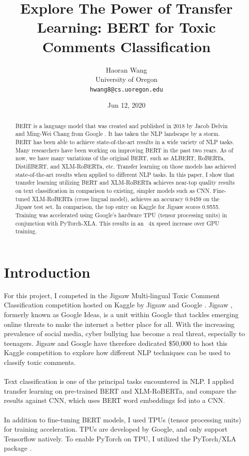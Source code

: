 \documentclass[11pt,a4paper]{article}
\title{Explore The Power of Transfer Learning: BERT for Toxic Comments Classification}
\author{Haoran Wang \\
  University of Oregon \\
  {\tt hwang8@cs.uoregon.edu} }
\date{Jun 12, 2020}
\begin{document}
\maketitle
\begin{abstract}
BERT is a language model that was created and published in 2018 by Jacob Delvin and Ming-Wei Chang from Google \cite{BERT}. It has taken the NLP landscape by a storm. BERT has been able to achieve state-of-the-art results in a wide variety of NLP tasks. Many researchers have been working on improving BERT in the past two years. As of now, we have  many variations of the original BERT, such as ALBERT, RoBERTa, DistillBERT, and XLM-RoBERTa, etc. Transfer learning on those models has achieved state-of-the-art results when applied to different NLP tasks. In this paper, I show that transfer learning utilizing BERT and XLM-RoBERTa achieves near-top quality results on text classification in comparison to existing, simpler models such as CNN. Fine-tuned XLM-RoBERTa (cross lingual model), achieves an accuracy 0.9459 on the Jigsaw test set. In comparison, the top entry on Kaggle for Jigsaw scores 0.9555. Training was accelerated using Google's hardware TPU (tensor processing units) in conjunction with PyTorch-XLA. This results in an ~4x speed increase over GPU training.
\end{abstract}

\section{Introduction}

For this project, I competed in the Jigsaw Multi-lingual Toxic Comment Classification competition hosted on Kaggle by Jigsaw and Google \cite{kaggle}. Jigsaw \cite{jigsaw}, formerly known as Google Ideas, is a unit within Google that tackles emerging online threats to make the internet a better place for all. With the increasing prevalence of social media, cyber bullying has become a real threat, especially to teenagers. Jigsaw and Google have therefore dedicated \$50,000 to host this Kaggle competition to explore how different NLP techniques can be used to classify toxic comments.\\
\\
Text classification is one of the principal tasks encountered in NLP. I applied transfer learning on pre-trained BERT and XLM-RoBERTa, and compare the results against CNN, which uses BERT word embeddings fed into a CNN.\\
\\
In addition to fine-tuning BERT models, I used TPUs (tensor processing units) for training acceleration. TPUs are developed by Google, and only support Tensorflow natively. To enable PyTorch on TPU, I utilized the PyTorch/XLA package \cite{xla}.
\end{document}
